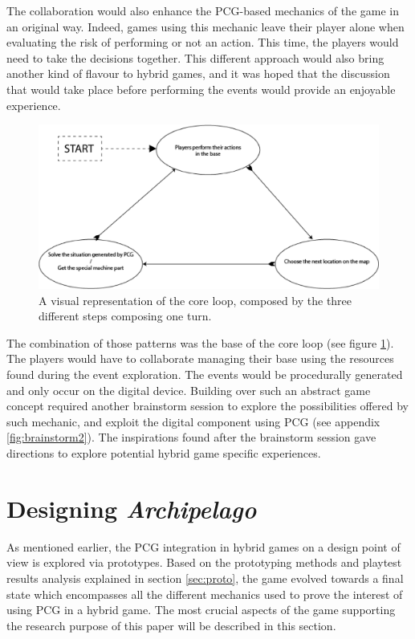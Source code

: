 The collaboration would also enhance the PCG-based mechanics of the game in an original way. Indeed, games using this mechanic leave their player alone when evaluating the risk of performing or not an action. This time, the players would need to take the decisions together. This different approach would also bring another kind of flavour to hybrid games, and it was hoped that the discussion that would take place before performing the events would provide an enjoyable experience.
\begin{figure}[h]
    \centering
    \includegraphics[scale=0.5]{Images/Core_loop.png}
    \caption{A visual representation of the core loop, composed by the three different steps composing one turn.}
    \label{fig:loop}
\end{figure}
The combination of those patterns was the base of the core loop (see figure \ref{fig:loop}). The players would have to collaborate managing their base using the resources found during the event exploration. The events would be procedurally generated and only occur on the digital device. Building over such an abstract game concept required another brainstorm session to explore the possibilities offered by such mechanic, and exploit the digital component using PCG (see appendix \ref{fig:brainstorm2}). The inspirations found after the brainstorm session gave directions to explore potential hybrid game specific experiences.
\section{Designing \textit{Archipelago}}
As mentioned earlier, the PCG integration in hybrid games on a design point of view is explored via prototypes. Based on the prototyping methods and playtest results analysis explained in section \ref{sec:proto}, the game evolved towards a final state which encompasses all the different mechanics used to prove the interest of using PCG in a hybrid game. The most crucial aspects of the game supporting the research purpose of this paper will be described in this section.
